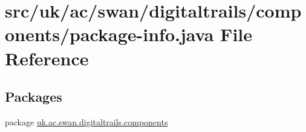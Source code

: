 \hypertarget{components_2package-info_8java}{\section{src/uk/ac/swan/digitaltrails/components/package-\/info.java File Reference}
\label{components_2package-info_8java}
}
\subsection*{Packages}
\begin{DoxyCompactItemize}
\item 
package \hyperlink{namespaceuk_1_1ac_1_1swan_1_1digitaltrails_1_1components}{uk.\+ac.\+swan.\+digitaltrails.\+components}
\end{DoxyCompactItemize}
